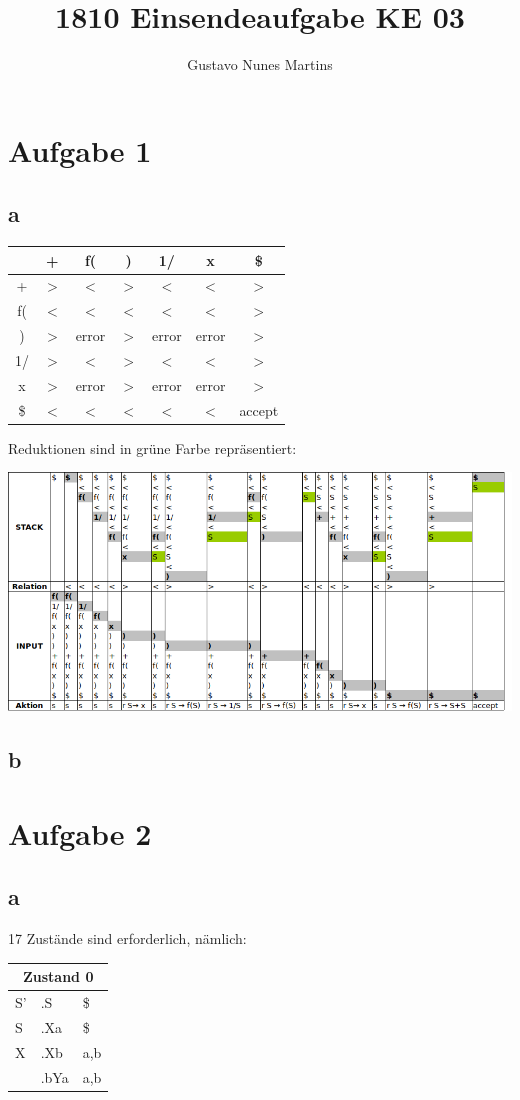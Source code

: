 \documentclass[11pt]{scrartcl}
\title{\textbf{1810 Einsendeaufgabe KE 03}}
\author{Gustavo Nunes Martins}
\begin{document}
	\maketitle
	\section*{Aufgabe 1}
	\subsection*{a}
	\begin{tabular}{c|c|c|c|c|c|c}
		  &+&f(&)&1/&x&\$ \\ \hline
		+ & $>$ & $<$ & $>$ & $<$ & $<$ & $>$ \\ \hline
		f(& $<$ & $<$ & $<$ & $<$ & $<$ & $>$  \\ \hline
		) & $>$ & error & $>$ & error & error & $>$  \\ \hline
		1/& $>$ & $<$ & $>$ & $<$ & $<$ & $>$  \\ \hline
		x & $>$ & error & $>$ & error & error & $>$  \\ \hline
		\$& $<$ & $<$ & $<$ & $<$ & $<$ & accept 
	\end{tabular}

Reduktionen sind in grüne Farbe repräsentiert:
\begin{center}
	\includegraphics[width=\linewidth]{table.png}
\end{center}
	
	\subsection*{b}
	\section*{Aufgabe 2}
	\subsection*{a}
	17 Zustände sind erforderlich, nämlich:
	\begin{table}[!htbp]
	\begin{tabular}{l|l|l}
		\multicolumn{3}{c}{Zustand 0} \\ \hline
		S' & .S & \$ \\ \hline
		S & .Xa & \$ \\ \hline
		X & .Xb & a,b \\
		& .bYa & a,b \\
	\end{tabular}
	\end{table}
\end{document}
